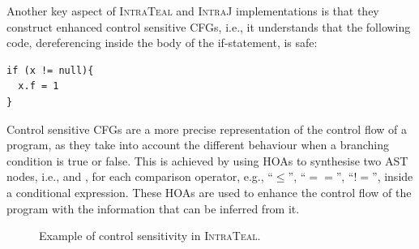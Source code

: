 Another key aspect of \textsc{IntraTeal} and \textsc{IntraJ} implementations is that they
construct enhanced control sensitive CFGs, i.e., it understands that the following code,
dereferencing  inside the body of the if-statement, is safe:
\begin{lstlisting}[language=JastAdd]
if (x != null){
  x.f = 1
}
\end{lstlisting}
Control sensitive CFGs are a more precise representation of the control flow of a program, as they take
into account the different behaviour when a branching condition is true or false. This is achieved by
using HOAs to synthesise two AST nodes, i.e.,  and , for each
comparison operator, e.g.,  ``$\le$'', ``$==$'', ``$!=$'', inside a conditional expression.
These HOAs are used to enhance the control flow of the program with the information that can be inferred from
it.
\begin{figure}
	\centering
	\caption{\label{fig:ExampleTEAL} Example of control sensitivity in \textsc{IntraTeal}.}
\end{figure}


